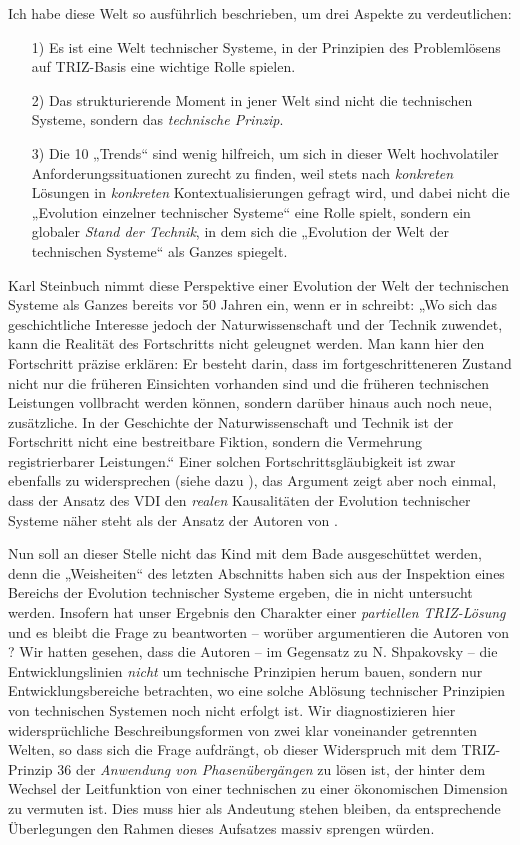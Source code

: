 \documentclass[11pt,a4paper]{article}
\begin{document}
Ich habe diese Welt so ausführlich beschrieben, um drei Aspekte zu
verdeutlichen:
\begin{itemize}
\item [1)] Es ist eine Welt technischer Systeme, in der Prinzipien des
  Problemlösens auf TRIZ-Basis eine wichtige Rolle spielen.
\item [2)] Das strukturierende Moment in jener Welt sind nicht die technischen
  Systeme, sondern das \emph{technische Prinzip}.
\item [3)] Die 10 „Trends“ sind wenig hilfreich, um sich in dieser Welt
  hochvolatiler Anforderungssituationen zurecht zu finden, weil stets nach
  \emph{konkreten} Lösungen in \emph{konkreten} Kontextualisierungen gefragt
  wird, und dabei nicht die „Evolution einzelner technischer Systeme“ eine
  Rolle spielt, sondern ein globaler \emph{Stand der Technik}, in dem sich die
  „Evolution der Welt der technischen Systeme“ als Ganzes spiegelt. 
\end{itemize}
Karl Steinbuch nimmt diese Perspektive einer Evolution der Welt der
technischen Systeme als Ganzes bereits vor 50 Jahren ein, wenn er in
\cite[S. 7]{Steinbuch1966} schreibt: „Wo sich das geschichtliche Interesse
jedoch der Naturwissenschaft und der Technik zuwendet, kann die Realität des
Fortschritts nicht geleugnet werden. Man kann hier den Fortschritt präzise
erklären: Er besteht darin, dass im fortgeschritteneren Zustand nicht nur die
früheren Einsichten vorhanden sind und die früheren technischen Leistungen
vollbracht werden können, sondern darüber hinaus auch noch neue, zusätzliche.
In der Geschichte der Naturwissenschaft und Technik ist der Fortschritt nicht
eine bestreitbare Fiktion, sondern die Vermehrung registrierbarer Leistungen.“
Einer solchen Fortschrittsgläubigkeit ist zwar ebenfalls zu widersprechen
(siehe dazu \cite{Graebe2012}), das Argument zeigt aber noch einmal, dass der
Ansatz des VDI den \emph{realen} Kausalitäten der Evolution technischer
Systeme näher steht als der Ansatz der Autoren von \cite{TESE2018}.

Nun soll an dieser Stelle nicht das Kind mit dem Bade ausgeschüttet werden,
denn die „Weisheiten“ des letzten Abschnitts haben sich aus der Inspektion
eines Bereichs der Evolution technischer Systeme ergeben, die in
\cite{TESE2018} nicht untersucht werden.  Insofern hat unser Ergebnis den
Charakter einer \emph{partiellen TRIZ-Lösung} und es bleibt die Frage zu
beantworten -- worüber argumentieren die Autoren von \cite{TESE2018}? Wir
hatten gesehen, dass die Autoren -- im Gegensatz zu N. Shpakovsky
\cite{Shpakovsky2010} -- die Entwicklungslinien \emph{nicht} um technische
Prinzipien herum bauen, sondern nur Entwicklungsbereiche betrachten, wo eine
solche Ablösung technischer Prinzipien von technischen Systemen noch nicht
erfolgt ist.  Wir diagnostizieren hier widersprüchliche Beschreibungsformen
von zwei klar voneinander getrennten Welten, so dass sich die Frage aufdrängt,
ob dieser Widerspruch mit dem TRIZ-Prinzip 36 der \emph{Anwendung von
  Phasenübergängen} zu lösen ist, der hinter dem Wechsel der Leitfunktion von
einer technischen zu einer ökonomischen Dimension zu vermuten ist. Dies muss
hier als Andeutung stehen bleiben, da entsprechende Überlegungen den Rahmen
dieses Aufsatzes massiv sprengen würden.
\end{document}
